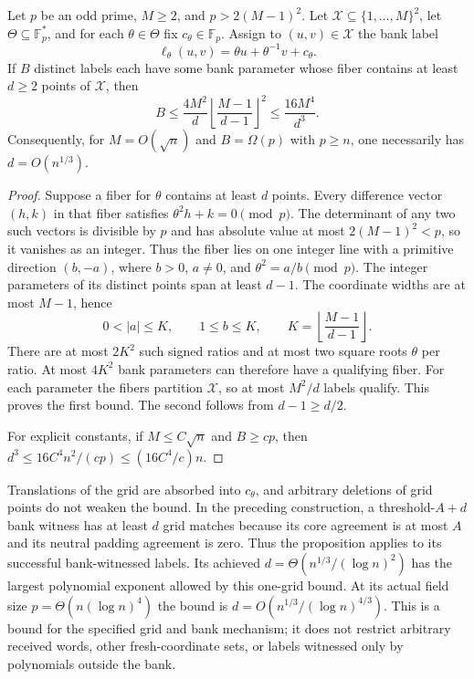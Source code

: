 \begin{proposition}
\label{prop:translated-grid-gap-ceiling}
Let $p$ be an odd prime, $M\ge2$, and $p>2(M-1)^2$.
Let $\mathcal X\subseteq\{1,\ldots,M\}^2$, let
$\Theta\subseteq\mathbb F_p^*$, and for each $\theta\in\Theta$
fix $c_\theta\in\mathbb F_p$.  Assign to $(u,v)\in\mathcal X$
the bank label
\[
 \ell_\theta(u,v)=\theta u+\theta^{-1}v+c_\theta.
\]
If $B$ distinct labels each have some bank parameter whose fiber
contains at least $d\ge2$ points of $\mathcal X$, then
\[
 B\le \frac{4M^2}{d}
       \left\lfloor\frac{M-1}{d-1}\right\rfloor^2
   \le \frac{16M^4}{d^3}.
\]
Consequently, for $M=O(\sqrt n)$ and $B=\Omega(p)$ with $p\ge n$,
one necessarily has $d=O(n^{1/3})$.
\end{proposition}
\begin{proof}
Suppose a fiber for $\theta$ contains at least $d$ points.
Every difference vector $(h,k)$ in that fiber satisfies
$\theta^2h+k=0\pmod p$.  The determinant of any two such
vectors is divisible by $p$ and has absolute value at most
$2(M-1)^2<p$, so it vanishes as an integer.  Thus the fiber
lies on one integer line with a primitive direction $(b,-a)$,
where $b>0$, $a\ne0$, and $\theta^2=a/b\pmod p$.
The integer parameters of its distinct points span at least $d-1$.
The coordinate widths are at most $M-1$, hence
\[
 0<|a|\le K,\qquad 1\le b\le K,
 \qquad K=\left\lfloor\frac{M-1}{d-1}\right\rfloor.
\]
There are at most $2K^2$ such signed ratios and at most two
square roots $\theta$ per ratio.  At most $4K^2$ bank parameters
can therefore have a qualifying fiber.  For each parameter the
fibers partition $\mathcal X$, so at most $M^2/d$ labels qualify.
This proves the first bound.  The second follows from
$d-1\ge d/2$.

For explicit constants, if $M\le C\sqrt n$ and $B\ge cp$,
then $d^3\le16C^4n^2/(cp)\le(16C^4/c)n$.
\end{proof}

Translations of the grid are absorbed into $c_\theta$, and arbitrary
deletions of grid points do not weaken the bound.  In the preceding
construction, a threshold-$A+d$ bank witness has at least $d$ grid
matches because its core agreement is at most $A$ and its neutral
padding agreement is zero.  Thus the proposition applies to its
successful bank-witnessed labels.  Its achieved
$d=\Theta(n^{1/3}/(\log n)^2)$ has the largest polynomial exponent
allowed by this one-grid bound.  At its actual field size
$p=\Theta(n(\log n)^4)$ the bound is
$d=O(n^{1/3}/(\log n)^{4/3})$.
This is a bound for the specified grid and bank mechanism; it does
not restrict arbitrary received words, other fresh-coordinate sets,
or labels witnessed only by polynomials outside the bank.
